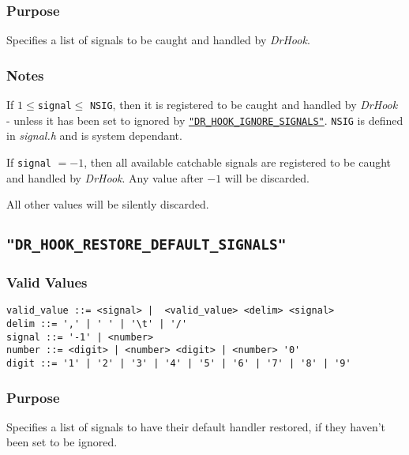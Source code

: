 \vspace{-2ex}
\subsubsection{Purpose}
\vspace{-2ex}
Specifies a list of signals to be caught and handled by \textit{DrHook}.

\vspace{-2ex}
\subsubsection{Notes}
\vspace{-2ex}
If $1 \leq $\verb|signal|$ \leq$ \verb+NSIG+, then it is registered to be caught and handled by \textit{DrHook} - unless it has been set to ignored by 
\hyperref[section:flags:DR_HOOK_IGNORE_SIGNALS]{\texttt{"DR\_HOOK\_IGNORE\_SIGNALS"}}. \verb|NSIG| is defined in \textit{signal.h} and is system dependant.

If \verb|signal| $= -1$, then all available catchable signals are registered to be caught and handled by \textit{DrHook}. Any value after $-1$ will be discarded.

All other values will be silently discarded.



\subsection{\texttt{"DR\_HOOK\_RESTORE\_DEFAULT\_SIGNALS"}}
\label{section:flags:DR_HOOK_RESTORE_DEFAULT_SIGNALS}
\vspace{-2ex}
\subsubsection{Valid Values}
\vspace{-2ex}
\verb+valid_value ::= <signal> |  <valid_value> <delim> <signal>+ \\
\verb+delim ::= ',' | ' ' | '\t' | '/'+ \\
\verb+signal ::= '-1' | <number>+\\
\verb+number ::= <digit> | <number> <digit> | <number> '0'+ \\
\verb+digit ::= '1' | '2' | '3' | '4' | '5' | '6' | '7' | '8' | '9'+

\vspace{-2ex}
\subsubsection{Purpose}
\vspace{-2ex}
Specifies a list of signals to have their default handler restored, if they haven't been set to be ignored.

